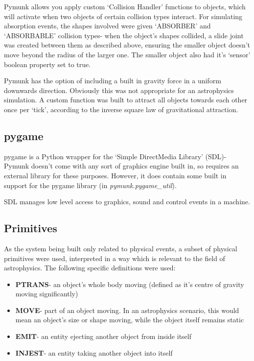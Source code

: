 \documentclass[dissertation.tex]{subfiles}
\begin{document}
    Pymunk allows you apply custom `Collision Handler' functions to objects, which will activate when two objects of certain collision types interact. For simulating absorption events, the shapes involved were given `ABSORBER' and `ABSORBABLE' collision types- when the object's shapes collided, a slide joint was created between them as described above, ensuring the smaller object doesn't move beyond the radius of the larger one. The smaller object also had it's `sensor' boolean property set to true.

    Pymunk has the option of including a built in gravity force in a uniform downwards direction. Obviously this was not appropriate for an astrophysics simulation. A custom function was built to attract all objects towards each other once per `tick', according to the inverse square law of gravitational attraction.

    \subsection{pygame}
    pygame is a Python wrapper for the `Simple DirectMedia Library' (SDL)\cite{pygame}- Pymunk doesn't come with any sort of graphics engine built in, so requires an external library for these purposes. However, it does contain some built in support for the pygame library (in \textit{pymunk.pygame\_util}).
    
    SDL manages low level access to graphics, sound and control events in a machine.\cite{SDL}

    \subsection{Primitives}
    As the system being built only related to physical events, a subset of physical primitives were used, interpreted in a way which is relevant to the field of astrophysics. The following specific definitions were used:
    \begin{itemize}
        \item \textbf{PTRANS}- an object's whole body moving (defined as it's centre of gravity moving significantly)
        \item \textbf{MOVE}- part of an object moving. In an astrophysics scenario, this would mean an object's size or shape moving, while the object itself remains static %
        \item \textbf{EMIT}- an entity ejecting another object from inside itself
        \item \textbf{INJEST}- an entity taking another object into itself
    \end{itemize}
\end{document}
